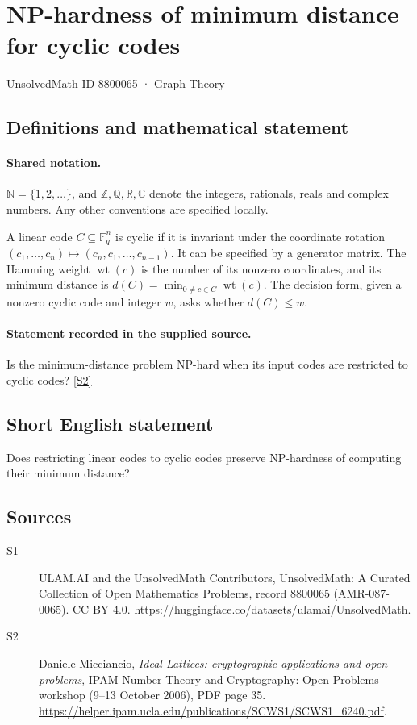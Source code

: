 \documentclass[11pt]{article}
\newcommand{\sref}[2]{\hyperlink{source:#1:#2}{[S#2]}}
\begin{document}
\setcounter{section}{8800064}
\section{NP-hardness of minimum distance for cyclic codes}\label{8800065}
{\small\sffamily UnsolvedMath ID 8800065 · Graph Theory}
\subsection{Definitions and mathematical statement}

\paragraph{Shared notation.}$\mathbb N=\{1,2,\ldots\}$, and $\mathbb Z,\mathbb Q,\mathbb R,\mathbb C$ denote the integers, rationals, reals and complex numbers. Any other conventions are specified locally.


A linear code $C\subseteq\mathbb F_q^n$ is cyclic if it is invariant under the coordinate rotation $(c_1,\ldots,c_n)\mapsto(c_n,c_1,\ldots,c_{n-1})$. It can be specified by a generator matrix. The Hamming weight $\operatorname{wt}(c)$ is the number of its nonzero coordinates, and its minimum distance is $d(C)=\min_{0\ne c\in C}\operatorname{wt}(c)$. The decision form, given a nonzero cyclic code and integer $w$, asks whether $d(C)\le w$.
\paragraph{Statement recorded in the supplied source.}
Is the minimum-distance problem NP-hard when its input codes are restricted to cyclic codes? \sref{8800065}{2}

\subsection{Short English statement}
Does restricting linear codes to cyclic codes preserve NP-hardness of computing their minimum distance?
\subsection{Sources}
\begin{description}
\item[\hypertarget{source:8800065:1}{S1}] ULAM.AI and the UnsolvedMath Contributors, UnsolvedMath: A Curated Collection of Open Mathematics Problems, record 8800065 (AMR-087-0065). CC BY 4.0. \url{https://huggingface.co/datasets/ulamai/UnsolvedMath}.
\item[\hypertarget{source:8800065:2}{S2}] Daniele Micciancio, \emph{Ideal Lattices: cryptographic applications and open problems}, IPAM Number Theory and Cryptography: Open Problems workshop (9--13 October 2006), PDF page 35. \url{https://helper.ipam.ucla.edu/publications/SCWS1/SCWS1_6240.pdf}.
\end{description}
\label{end:8800065}
\end{document}
